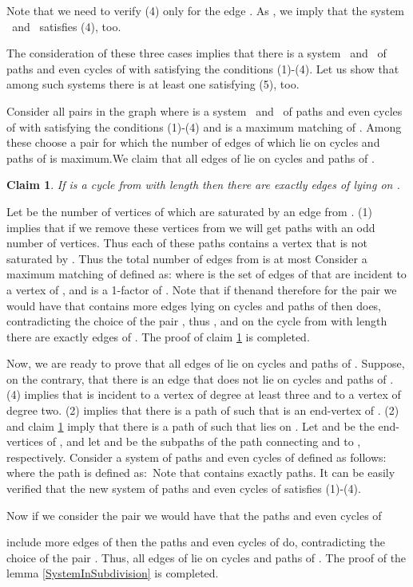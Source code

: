 \documentclass[fleqn,12pt,twoside]{article}
\newtheorem{claim}{Claim}
\newenvironment{proof}[1][Proof.]{\begin{trivlist}
\item[\hskip \labelsep {\bfseries #1}]}{\end{trivlist}}
\begin{document}
\begin{proof}
Note that we need to verify (4) only for the edge . As ,  we imply that
the
system \textit{\ }and\textit{\ } satisfies (4), too.

The consideration of these three cases implies that there is a system \textit{\ }and\textit{\ } of paths and even cycles of  with  satisfying the conditions (1)-(4).
Let us show that among such systems there is at least one satisfying
(5), too.

Consider all pairs  in the
graph  where  is a system \textit{\ }and\textit{\ } of paths and even cycles of  with  satisfying the conditions (1)-(4) and  is a maximum matching of . Among these
choose a pair  for which the
number of edges of  which lie on cycles and paths of
 is maximum.We claim that all edges of
 lie on cycles and paths of .

\begin{claim}
\label{CycleCase}If  is a cycle from 
with length  then there are exactly  edges of 
lying on .
\end{claim}

\begin{proof}
Let  be the number of vertices of  which are saturated by an
edge from . (1) implies that if we
remove these  vertices from  we will get  paths with an odd
number of vertices. Thus
each of these  paths contains a vertex that is not saturated by . Thus the total number of edges from  is at most
Consider a maximum matching  of  defined
as:
where  is the set of edges of  that
are
incident to a vertex of , and  is a 1-factor of . Note that if  thenand therefore for the pair  we would have that  contains more edges
lying on cycles and paths of  then
 does, contradicting the choice of the pair
, thus , and on the cycle
 from  with length  there are exactly
 edges of . The proof of claim \ref{CycleCase} is
completed.
\end{proof}

Now, we are ready to prove that all edges of  lie on
cycles and paths of . Suppose, on the
contrary, that there is an edge  that
does not lie on cycles and paths of . (4)
implies that  is incident to a vertex  of degree at
least three and to a vertex  of degree two. (2)
implies that there is a path  of  such that  is an end-vertex of . (2) and claim \ref{CycleCase} imply
that
there is a path  of  such that  lies on . Let  and  be the end-vertices of , and let  and  be the subpaths of the path  connecting  and 
to , respectively. Consider a system  of paths and even cycles of  defined as follows:
where the path  is defined as:\ Note that  contains exactly
 paths. It can be easily verified that the new system
 of paths and even cycles of
 satisfies (1)-(4).

Now if we consider the pair  we would have that the paths and even cycles of

include more edges of  then the paths and even cycles of  do, contradicting the choice of the pair . Thus, all edges of  lie on
cycles
and paths of . The proof of the lemma \ref {SystemInSubdivision} is completed.
\end{proof}
\end{document}
